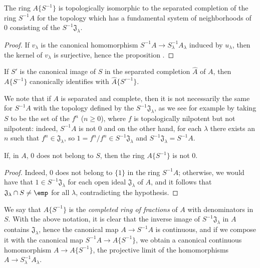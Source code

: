\begin{proposition}[7.6.2]
\label{0.7.6.2}
The ring $A\{S^{-1}\}$ is topologically isomorphic to the separated completion of the ring
$S^{-1}A$ for the topology which has a fundamental system of neighborhoods of $0$ consisting of
the $S^{-1}\mathfrak{J}_\lambda$.
\end{proposition}

\begin{proof}
\label{proof-0.7.6.2}
If $v_\lambda$ is the canonical homomorphism $S^{-1}A\to S_\lambda^{-1}A_\lambda$ induced
by $u_\lambda$, then the kernel of $v_\lambda$ is surjective, hence the proposition .
\end{proof}

\begin{corollary}[7.6.3]
\label{0.7.6.3}
If $S'$ is the canonical image of $S$ in the separated completion $\widehat{A}$ of $A$, then
$A\{S^{-1}\}$ canonically identifies with $\widehat{A}\{{S'}^{-1}\}$.
\end{corollary}

We note that if $A$ is separated and complete, then it is not necessarily the same for
$S^{-1}A$ with the topology defined by the $S^{-1}\mathfrak{J}_\lambda$, as we see for example
by taking $S$ to be the set of the $f^n$ ($n\geq 0$), where $f$ is topologically nilpotent
but not nilpotent: indeed, $S^{-1}A$ is not $0$ and on the other hand, for each $\lambda$ there
exists an $n$ such that $f^n\in\mathfrak{J}_\lambda$, so $1=f^n/f^n\in S^{-1}\mathfrak{J}_\lambda$
and $S^{-1}\mathfrak{J}_\lambda=S^{-1}A$.

\begin{corollary}[7.6.4]
\label{0.7.6.4}
If, in $A$, $0$ does not belong to $S$, then the ring $A\{S^{-1}\}$ is not $0$.
\end{corollary}

\begin{proof}
\label{proof-0.7.6.4}
Indeed, $0$ does not belong to $\{1\}$ in the ring $S^{-1}A$; otherwise, we would have that
$1\in S^{-1}\mathfrak{J}_\lambda$ for each open ideal $\mathfrak{J}_\lambda$ of $A$, and it
follows that $\mathfrak{J}_\lambda\cap S\neq\emp$ for all $\lambda$, contradicting the
hypothesis.
\end{proof}

\begin{env}[7.6.5]
\label{0.7.6.5}
We say that $A\{S^{-1}\}$ is the \emph{completed ring of fractions} of $A$ with denominators
in $S$. With the above notation, it is clear that the inverse image of $S^{-1}\mathfrak{J}_\lambda$
in $A$ contains $\mathfrak{J}_\lambda$, hence the canonical map $A\to S^{-1}A$ is continuous, and if
we compose it with the canonical map $S^{-1}A\to A\{S^{-1}\}$, we obtain a canonical continuous
homomorphism $A\to A\{S^{-1}\}$, the projective limit of the homomorphisms
$A\to S_\lambda^{-1}A_\lambda$.
\end{env}


